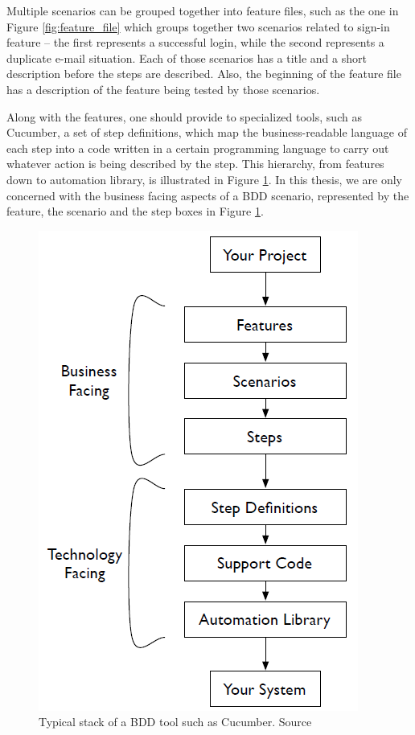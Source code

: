 Multiple scenarios can be grouped together into feature files, such as the one in Figure \ref{fig:feature_file} which groups together two scenarios related to sign-in feature -- the first represents a successful login, while the second represents a duplicate e-mail situation. Each of those scenarios has a title and a short description before the steps are described. Also, the beginning of the feature file has a description of the feature being tested by those scenarios.

Along with the features, one should provide to specialized tools, such as Cucumber, a set of step definitions, which
map the business-readable language of each step into a code written in a certain programming language to carry out whatever action is being described by the step. This hierarchy, from features down to automation library, is illustrated in Figure \ref{fig:bdd_stack}. In this thesis, we are only concerned with the business facing aspects of a BDD scenario, represented by the feature, the scenario and the step boxes in Figure \ref{fig:bdd_stack}.

\begin{figure}[t]
\centering
\includegraphics[scale=0.7]{images/bdd_stack}
\caption{Typical stack of a BDD tool such as Cucumber. Source \cite{Wynne_and_Hellesoy_2012}}
\label{fig:bdd_stack}
\end{figure}

